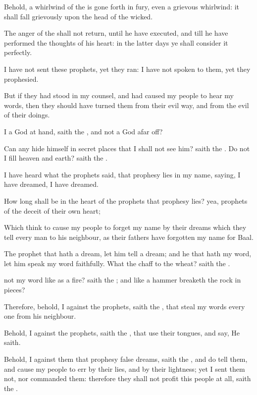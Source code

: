{Behold, a
whirlwind of the
{} is gone
forth in
fury, even a
grievous
whirlwind: it shall fall
grievously upon the
head of the
wicked.

The
anger of the
{} shall not
return, until he have
executed, and till he have
performed the
thoughts of his
heart: in the
latter
days ye shall
consider it
perfectly.

I have not
sent these
prophets, yet they
ran: I have not
spoken to them, yet they
prophesied.

But if they had
stood in my
counsel, and had caused my
people to
hear my
words, then they should have
turned them from their
evil
way, and from the
evil of their
doings.

 I a
God at
hand,
saith the
{}, and not a
God afar
off?

Can
any
hide himself in secret
places that I shall not
see him?
saith the
{}. Do not I
fill
heaven and
earth?
saith the
{}.

I have
heard what the
prophets
said, that
prophesy
lies in my
name,
saying, I have
dreamed, I have
dreamed.

How long shall
{}
be in the
heart of the
prophets that
prophesy
lies? yea,
{}
prophets of the
deceit of their own
heart;

Which
think to cause my
people to
forget my
name by their
dreams which they
tell every
man to his
neighbour, as their
fathers have
forgotten my
name for
Baal.

The
prophet that hath a
dream, let him
tell a
dream; and he that hath my
word, let him
speak my
word
faithfully. What
{} the
chaff to the
wheat?
saith the
{}.

 not my
word
like as a
fire?
saith the
{}; and like a
hammer
{}
breaketh the
rock in
pieces?

Therefore, behold, I
{} against the
prophets,
saith the
{}, that
steal my
words every
one from his
neighbour.

Behold, I
{} against the
prophets,
saith the
{}, that
use their
tongues, and
say, He
saith.

Behold, I
{} against them that
prophesy
false
dreams,
saith the
{}, and do
tell them, and cause my
people to
err by their
lies, and by their
lightness; yet I
sent them not, nor
commanded them: therefore they shall not
profit this
people at
all,
saith the
{}.


}
